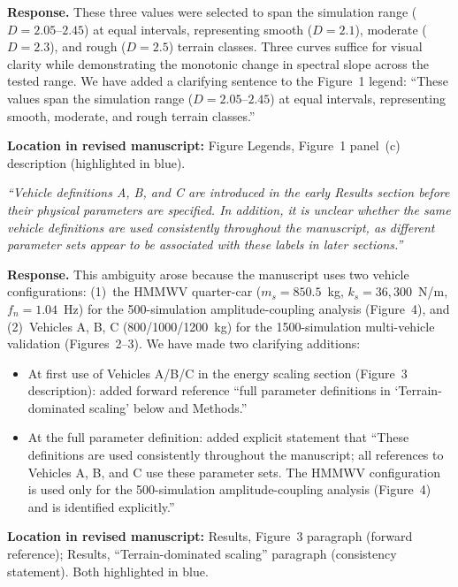 \documentclass[11pt]{article}
\newcommand{\revquote}[1]{\medskip\noindent\textit{``#1''}\medskip}
\newcommand{\revloc}[1]{\noindent\textbf{Location in revised manuscript:} #1\medskip}
\begin{document}
\noindent\textbf{Response.} These three values were selected to span the simulation range ($D = 2.05$--$2.45$) at equal intervals, representing smooth ($D = 2.1$), moderate ($D = 2.3$), and rough ($D = 2.5$) terrain classes. Three curves suffice for visual clarity while demonstrating the monotonic change in spectral slope across the tested range. We have added a clarifying sentence to the Figure~1 legend: ``These values span the simulation range ($D = 2.05$--$2.45$) at equal intervals, representing smooth, moderate, and rough terrain classes.''

\revloc{Figure Legends, Figure~1 panel~(c) description (highlighted in blue).}

\bigskip

\revquote{Vehicle definitions A, B, and C are introduced in the early Results section before their physical parameters are specified. In addition, it is unclear whether the same vehicle definitions are used consistently throughout the manuscript, as different parameter sets appear to be associated with these labels in later sections.}

\noindent\textbf{Response.} This ambiguity arose because the manuscript uses two vehicle configurations: (1)~the HMMWV quarter-car ($m_s = 850.5$~kg, $k_s = 36{,}300$~N/m, $f_n = 1.04$~Hz) for the 500-simulation amplitude-coupling analysis (Figure~4), and (2)~Vehicles A, B, C (800/1000/1200~kg) for the 1500-simulation multi-vehicle validation (Figures~2--3). We have made two clarifying additions:

\begin{itemize}[leftmargin=*]
\item At first use of Vehicles A/B/C in the energy scaling section (Figure~3 description): added forward reference ``full parameter definitions in `Terrain-dominated scaling' below and Methods.''
\item At the full parameter definition: added explicit statement that ``These definitions are used consistently throughout the manuscript; all references to Vehicles A, B, and C use these parameter sets. The HMMWV configuration is used only for the 500-simulation amplitude-coupling analysis (Figure~4) and is identified explicitly.''
\end{itemize}

\revloc{Results, Figure~3 paragraph (forward reference); Results, ``Terrain-dominated scaling'' paragraph (consistency statement). Both highlighted in blue.}

\bigskip
\end{document}

